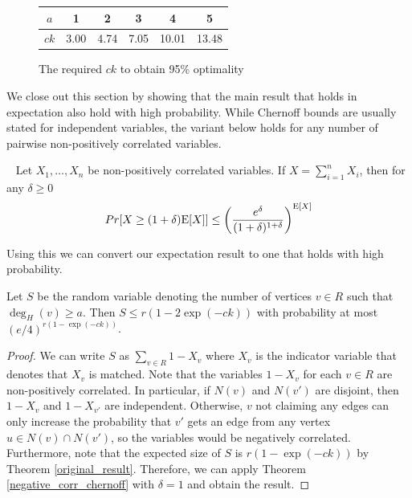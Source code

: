 
\begin{figure}[h]
  \centering
  \begin{tabular}{ |c|c|c|c|c|c| }
    \hline
    $a$ & 1 & 2 & 3 & 4 & 5 \\ \hline
    $ck$ & 3.00 & 4.74 & 7.05 & 10.01 & 13.48 \\
    \hline
  \end{tabular}
  \caption{The required $ck$ to obtain 95\% optimality}
\end{figure} 

We close out this section by showing that the main result that holds in expectation also hold with high probability. 
While Chernoff bounds are usually stated for independent variables, the
variant below holds for any number of pairwise non-positively correlated
variables.

\begin{thm}\label{negative_corr_chernoff}~\cite{AugerDoerr2011}
Let $X_1,\ldots, X_n$ be non-positively correlated variables. If $X=\sum_{i=1}^n X_i$, then for any $\delta\geq 0$
\[ Pr[X \geq (1+\delta)\text{E}[X] ] \leq \left(\frac{e^\delta}{(1+\delta)^{1+\delta}}\right)^{\text{E}[X]} \]
\end{thm}

Using this we can convert our expectation result to one that holds 
with high probability.

\begin{thm}
Let $S$ be the random variable denoting the number of vertices $v \in R$ such that $\deg_{H}(v)\geq a$. Then
$ S \leq r(1-2\exp(-ck))$ with probability at most $(e/4)^{r(1-\exp(-ck))}$.
\end{thm}

\begin{proof}
We can write $S$ as $\sum_{v\in R} 1-X_v$ where $X_v$ is the indicator
variable that denotes that $X_v$ is matched. Note that the variables 
$1-X_v$ for each $v\in R$ are non-positively correlated. In particular,
if $N(v)$ and $N(v')$ are disjoint, then $1-X_v$ and $1-X_{v'}$ are 
independent. Otherwise, $v$ not claiming any edges can only increase 
the probability that $v'$ gets an edge from any vertex
$u\in N(v)\cap N(v')$, so the variables would be negatively correlated.
Furthermore, note that the expected size of $S$ is $r(1-\exp(-ck))$ by
Theorem \ref{original_result}. Therefore, we can apply Theorem 
\ref{negative_corr_chernoff} with $\delta=1$ and obtain the result.
\end{proof}
